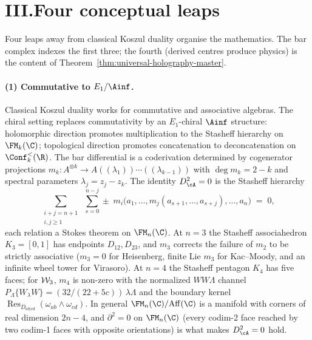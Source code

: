 \section*{III.\quad Four conceptual leaps}

\noindent
Four leaps away from classical Koszul duality organise the
mathematics. The bar complex indexes the first three; the fourth
(derived centres produce physics) is the content of
Theorem~\ref{thm:universal-holography-master}.

\paragraph{(1) Commutative to $E_1/\Ainf$.}
Classical Koszul duality works for commutative and associative
algebras. The chiral setting replaces commutativity by an
$E_1$-chiral $\Ainf$ structure: holomorphic direction promotes
multiplication to the Stasheff hierarchy on $\FM_k(\C)$;
topological direction promotes concatenation to deconcatenation
on $\Conf_k^<(\R)$. The bar differential is a coderivation
determined by cogenerator projections $m_k\colon A^{\otimes k}
\to A((\lambda_1))\cdots((\lambda_{k-1}))$ with
$\deg m_k = 2 - k$ and spectral parameters
$\lambda_j = z_j - z_k$. The identity $D_\cA^2 = 0$ is the
Stasheff hierarchy
\[
\sum_{\substack{i+j = n+1 \\ i,j \ge 1}}\;\sum_{s=0}^{n-j}
\pm\; m_i\bigl(a_1, \ldots, m_j(a_{s+1}, \ldots, a_{s+j}),
\ldots, a_n\bigr) \;=\; 0,
\]
each relation a Stokes theorem on $\FM_n(\C)$. At $n = 3$
the Stasheff associahedron $K_3 = [0,1]$ has endpoints
$D_{12}, D_{23}$, and $m_3$ corrects the failure of $m_2$ to be
strictly associative ($m_3 = 0$ for Heisenberg, finite Lie $m_3$ for
Kac--Moody, and an infinite wheel tower for Virasoro). At $n = 4$ the Stasheff pentagon
$K_4$ has five faces; for $\mathcal{W}_3$, $m_4$ is non-zero with
the normalized $WW\Lambda$ channel
\(P_\Lambda\{W_\lambda W\}=(32/(22+5c))\,\lambda\Lambda\)
and the boundary kernel
\(\operatorname{Res}_{D_{ab|cd}}(\omega_{ab}\wedge\omega_{cd})\).
In general $\FM_n(\C)/\mathrm{Aff}(\C)$ is a manifold with corners
of real dimension $2n - 4$, and $\partial^2 = 0$ on $\FM_n(\C)$
(every codim-2 face reached by two codim-1 faces with opposite
orientations) is what makes $D_\cA^2 = 0$ hold.

